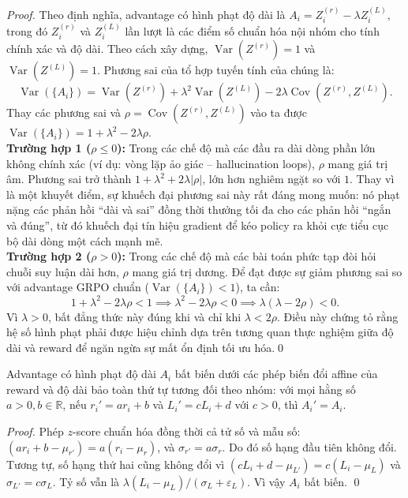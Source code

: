 \documentclass[11pt,a4paper]{article}
\begin{document}
\begin{proof}
Theo định nghĩa, advantage có hình phạt độ dài là $A_i = Z_i^{(r)} - \lambda Z_i^{(L)}$, trong đó $Z_i^{(r)}$ và $Z_i^{(L)}$ lần lượt là các điểm số chuẩn hóa nội nhóm cho tính chính xác và độ dài. Theo cách xây dựng, $\operatorname{Var}(Z^{(r)}) = 1$ và $\operatorname{Var}(Z^{(L)}) = 1$. Phương sai của tổ hợp tuyến tính của chúng là:$$\operatorname{Var}(\{A_i\}) = \operatorname{Var}(Z^{(r)}) + \lambda^2\operatorname{Var}(Z^{(L)}) - 2\lambda\operatorname{Cov}(Z^{(r)}, Z^{(L)}).$$Thay các phương sai và $\rho = \operatorname{Cov}(Z^{(r)}, Z^{(L)})$ vào ta được $\operatorname{Var}(\{A_i\}) = 1 + \lambda^2 - 2\lambda\rho$.
\\ \textbf{Trường hợp 1 ($\rho \le 0$):} Trong các chế độ mà các đầu ra dài dòng phần lớn không chính xác (ví dụ: vòng lặp ảo giác -- hallucination loops), $\rho$ mang giá trị âm. Phương sai trở thành $1 + \lambda^2 + 2\lambda|\rho|$, lớn hơn nghiêm ngặt so với $1$. Thay vì là một khuyết điểm, sự khuếch đại phương sai này rất đáng mong muốn: nó phạt nặng các phản hồi ``dài và sai'' đồng thời thưởng tối đa cho các phản hồi ``ngắn và đúng'', từ đó khuếch đại tín hiệu gradient để kéo policy ra khỏi cực tiểu cục bộ dài dòng một cách mạnh mẽ.
\\ \textbf{Trường hợp 2 ($\rho > 0$):} Trong các chế độ mà các bài toán phức tạp đòi hỏi chuỗi suy luận dài hơn, $\rho$ mang giá trị dương. Để đạt được sự giảm phương sai so với advantage GRPO chuẩn ($\operatorname{Var}(\{A_i\}) < 1$), ta cần:$$1 + \lambda^2 - 2\lambda\rho < 1 \implies \lambda^2 - 2\lambda\rho < 0 \implies \lambda(\lambda - 2\rho) < 0.$$Vì $\lambda > 0$, bất đẳng thức này đúng khi và chỉ khi $\lambda < 2\rho$. Điều này chứng tỏ rằng hệ số hình phạt phải được hiệu chỉnh dựa trên tương quan thực nghiệm giữa độ dài và reward để ngăn ngừa sự mất ổn định tối ưu hóa.\qed
\end{proof}

\begin{lemma}\label{lem:scale_invariance}
Advantage có hình phạt độ dài \(A_i\) bất biến dưới các phép biến đổi affine của reward và độ dài bảo toàn thứ tự tương đối theo nhóm: với mọi hằng số \(a>0, b\in\mathbb{R}\), nếu \(r_i' = a r_i + b\) và \(L_i' = c L_i + d\) với \(c>0\), thì \(A_i' = A_i\).
\end{lemma}

\begin{proof}
Phép \(z\)-score chuẩn hóa đồng thời cả tử số và mẫu số: \((a r_i + b - \mu_{r'}) = a(r_i - \mu_r)\), và \(\sigma_{r'} = a\sigma_r\). Do đó số hạng đầu tiên không đổi. Tương tự, số hạng thứ hai cũng không đổi vì \((c L_i + d - \mu_{L'}) = c(L_i - \mu_L)\) và \(\sigma_{L'} = c\sigma_L\). Tỷ số vẫn là \(\lambda (L_i-\mu_L)/(\sigma_L+\varepsilon_L)\). Vì vậy \(A_i\) bất biến. \qed
\end{proof}
\end{document}

